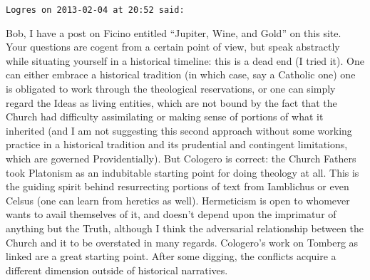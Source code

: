 \begin{footnotesize}
\begin{sffamily}
\hfill

\texttt{Logres on 2013-02-04 at 20:52 said:}

Bob, I have a post on Ficino entitled ``Jupiter, Wine, and Gold'' on this site. Your questions are cogent from a certain point of view, but speak abstractly while situating yourself in a historical timeline: this is a dead end (I tried it). One can either embrace a historical tradition (in which case, say a Catholic one) one is obligated to work through the theological reservations, or one can simply regard the Ideas as living entities, which are not bound by the fact that the Church had difficulty assimilating or making sense of portions of what it inherited (and I am not suggesting this second approach without some working practice in a historical tradition and its prudential and contingent limitations, which are governed Providentially). But Cologero is correct: the Church Fathers took Platonism as an indubitable starting point for doing theology at all. This is the guiding spirit behind resurrecting portions of text from Iamblichus or even Celsus (one can learn from heretics as well). Hermeticism is open to whomever wants to avail themselves of it, and doesn't depend upon the imprimatur of anything but the Truth, although I think the adversarial relationship between the Church and it to be overstated in many regards. Cologero's work on Tomberg as linked are a great starting point. After some digging, the conflicts acquire a different dimension outside of historical narratives.


\hfill

\end{sffamily}
\end{footnotesize}

